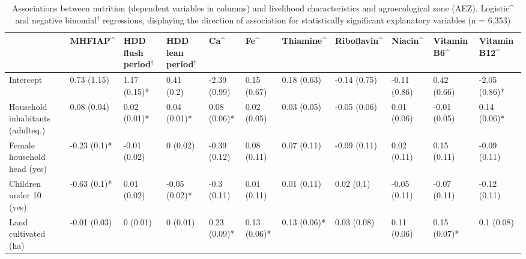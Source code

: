 \vspace*{\fill}

\begin{table}
  \captionsetup{singlelinecheck = false, justification=justified}
  \caption{Associations between nutrition (dependent variables in columns) and livelihood characteristics and agroecological zone (AEZ). Logistic\textasciicircum{} and negative binomial$^{\dag}$ regressions, displaying the direction of association for statistically significant explanatory variables (n = 6,353)}
  \label{tab:C_7}
  \small
\begin{tabularx}{\textwidth}{
p{}
p{}
p{}
p{}
p{}
p{}
p{}
p{}
p{}
p{}
p{}}
\toprule
 & MHFIAP\textasciicircum{} & HDD flush period$^{\dag}$ & HDD lean period$^{\dag}$ & Ca\textasciicircum{} & Fe\textasciicircum{} & Thiamine\textasciicircum{} & Riboflavin\textasciicircum{} & Niacin\textasciicircum{} & Vitamin B6\textasciicircum{} & Vitamin B12\textasciicircum{} \\
\midrule
Intercept & 0.73 (1.15) & 1.17 (0.15)* & 0.41 (0.2) & -2.39 (0.99) & 0.15 (0.67) & 0.18 (0.63) & -0.14 (0.75) & -0.11 (0.86) & 0.42 (0.66) & -2.05 (0.86)* \\
Household inhabitants (adulteq.) & 0.08 (0.04) & 0.02 (0.01)* & 0.04 (0.01)* & 0.08 (0.06)* & 0.02 (0.05) & 0.03 (0.05) & -0.05 (0.06) & 0.01 (0.06) & -0.01 (0.05) & 0.14 (0.06)* \\
Female household head (yes) & -0.23 (0.1)* & -0.01 (0.02) & 0 (0.02) & -0.39 (0.12) & 0.08 (0.11) & 0.07 (0.11) & -0.09 (0.11) & 0.02 (0.11) & 0.15 (0.11) & -0.09 (0.11) \\
Children under 10 (yes) & -0.63 (0.1)* & 0.01 (0.02) & -0.05 (0.02)* & -0.3 (0.11) & 0.01 (0.11) & 0.01 (0.11) & 0.02 (0.1) & -0.05 (0.11) & -0.07 (0.11) & -0.12 (0.11) \\
\arrayrulecolor{black!30}\midrule
Land cultivated (ha) & -0.01 (0.03) & 0 (0.01) & 0 (0.01) & 0.23 (0.09)* & 0.13 (0.06)* & 0.13 (0.06)* & 0.03 (0.08) & 0.11 (0.06) & 0.15 (0.07)* & 0.1 (0.08) \\

\end{tabularx}
\end{table}
